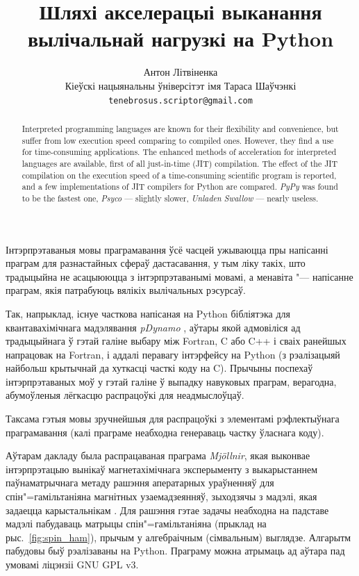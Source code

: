 \documentclass[a4paper,12pt]{article}
\newcommand{\progname}{\textit} %
\begin{document}
\renewcommand{\figurename}{Рыс.} %
\renewcommand{\abstractname}{Анатацыя}
\renewcommand{\refname}{Літаратура}

\title{Шляхі акселерацыі выканання вылічальнай нагрузкі на Python}
\author{Антон Літвіненка\\ \small Кіеўскі нацыянальны ўніверсітэт імя Тараса Шаўчэнкі\\ \small \texttt{tenebrosus.scriptor@gmail.com}}
\date{}
\maketitle

\begin{abstract}
Interpreted programming languages are known for their flexibility and convenience, but suffer from low execution speed comparing to compiled ones. However, they find a use for time-consuming applications. The enhanced methods of acceleration for interpreted languages are available, first of all just-in-time (JIT) compilation. The effect of the JIT compilation on the execution speed of a time-consuming scientific program is reported, and a few implementations of JIT compilers for Python are compared. \progname{PyPy} was found to be the fastest one, \progname{Psyco} --- slightly slower, \progname{Unladen Swallow} --- nearly useless.
\end{abstract}

Інтэрпрэтаваныя мовы праграмавання ўсё часцей ужываюцца пры напісанні праграм для разнастайных сфераў дастасавання, у тым ліку такіх, што традыцыйна не асацыююцца з інтэрпрэтаванымі мовамі, а менавіта "--- напісанне праграм, якія патрабуюць вялікіх вылічальных рэсурсаў.

Так, напрыклад, існуе часткова напісаная на Python бібліятэка для квантавахімічнага мадэлявання \progname{pDynamo} \cite{pDynamo}, аўтары якой адмовіліся ад традыцыйнага ў гэтай галіне выбару між Fortran, C або C++ і сваіх ранейшых напрацовак на Fortran, і аддалі перавагу інтэрфейсу на Python (з рэалізацыяй найбольш крытычнай да хуткасці часткі коду на C). Прычыны поспехаў інтэрпрэтаваных моў у гэтай галіне ў выпадку навуковых праграм, верагодна, абумоўленыя лёгкасцю распрацоўкі для неадмыслоўцаў.

Таксама гэтыя мовы зручнейшыя для распрацоўкі з элементамі рэфлектыўнага праграмавання (калі праграме неабходна генераваць частку ўласнага коду).

Аўтарам дакладу была распрацаваная праграма \progname{Mj{\"o}llnir}, якая выконвае інтэрпрэтацыю вынікаў магнетахімічнага эксперыменту з выкарыстаннем паўнаматрычнага метаду рашэння аператарных ураўненняў для спін"=гамільтаніяна магнітных узаемадзеянняў, зыходзячы з мадэлі, якая задаецца карыстальнікам \cite{Mjollnir}. Для рашэння гэтае задачы неабходна на падставе мадэлі пабудаваць матрыцы спін"=гамільтаніяна (прыклад на рыс.~\ref{fig:spin_ham}), прычым у алгебраічным (сімвальным) выглядзе. Алгарытм пабудовы быў рэалізаваны на Python. Праграму можна атрымаць ад аўтара пад умовамі ліцэнзіі GNU GPL v3.
\end{document}
